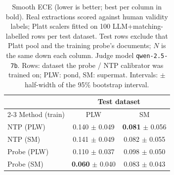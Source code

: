 \begin{table}[t]
\centering
\small
\caption{Smooth ECE (lower is better; best per column in bold). Real extractions scored against human validity labels; Platt scalers fitted on 100 LLM+matching-labelled rows per test dataset. Test rows exclude that Platt pool and the training probe's documents; $N$ is the same down each column. Judge model \texttt{qwen-2.5-7b}. Rows: dataset the probe / NTP calibrator was trained on; PLW: pond, SM: supermat. Intervals: $\pm$ half-width of the 95\% bootstrap interval.}
\label{tab:calibration-validated-real-smece}
\begin{tabular}{lcc}
\toprule
& \multicolumn{2}{c}{Test dataset} \\
\cmidrule(l){2-3}
Method (train) & PLW & SM \\
\midrule
NTP (PLW) & 0.140 $\pm$ 0.049 & \textbf{0.081} $\pm$ 0.056 \\
NTP (SM) & 0.141 $\pm$ 0.049 & 0.082 $\pm$ 0.055 \\
\midrule
Probe (PLW) & 0.110 $\pm$ 0.037 & 0.098 $\pm$ 0.050 \\
Probe (SM) & \textbf{0.060} $\pm$ 0.040 & 0.083 $\pm$ 0.043 \\
\bottomrule
\end{tabular}
\end{table}
